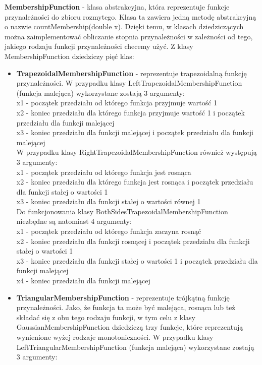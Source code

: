 \documentclass{classrep}
\begin{document}
{\bf MembershipFunction} - klasa abstrakcyjna, która reprezentuje funkcje przynależności do zbioru rozmytego. Klasa ta zawiera jedną metodę abstrakcyjną o nazwie countMembership(double x). Dzięki temu, w klasach dziedziczących można zaimplementować obliczanie stopnia przynależności w zależności od tego, jakiego rodzaju funkcji przynależności checemy użyć. \cite{uml_doc} 
Z klasy MembershipFunction dziedziczy pięć klas:
\begin{itemize}
    \item {\bf TrapezoidalMembershipFunction} - reprezentuje trapezoidalną funkcję przynależności. W przypadku klasy LeftTrapezoidalMembershipFunction (funkcja malejąca) wykorzystane zostają 3 argumenty: \\
    x1 - początek przedziału od którego funkcja przyjmuje wartość 1 \\
    x2 - koniec przedziału dla którego funkcja przyjmuje wartość 1 i początek przedziału dla funkcji malejącej \\
    x3 - koniec przedziału dla funkcji malejącej i początek przedziału dla funkcji malejącej \\
    W przypadku klasy RightTrapezoidalMembershipFunction również występują 3 argumenty: \\
    x1 - początek przedziału od którego funkcja jest rosnąca \\
    x2 - koniec przedziału dla którego funkcja jest rosnąca i początek przedziału dla funkcji stałej o wartości 1 \\
    x3 - koniec przedziału dla funkcji stałej o wartości równej 1 \\
    Do funkcjonowania klasy BothSidesTrapezoidalMembershipFunction niezbędne są natomiast 4 argumenty: \\
    x1 - początek przedziału od którego funkcja zaczyna rosnąć \\
    x2 - koniec przedziału dla funkcji rosnącej i początek przedziału dla funkcji stałej o wartości 1 \\
    x3 - koniec przedziału dla funkcji stałej o wartości 1 i początek przedziału dla funkcji malejącej \\
    x4 - koniec przedziału dla funkcji malejącej 
    \item {\bf TriangularMembershipFunction} - reprezentuje trójkątną funkcję przynależności. Jako, że funkcja ta może być malejąca, rosnąca lub też składać się z obu tego rodzaju funkcji, w tym celu z klasy GaussianMembershipFunction dziedziczą trzy funkcje, które reprezentują wynienione wyżej rodzaje monotoniczności. W przypadku klasy LeftTriangularMembershipFunction (funkcja malejąca) wykorzystane zostają 3 argumenty: \\

\end{itemize}
\end{document}
